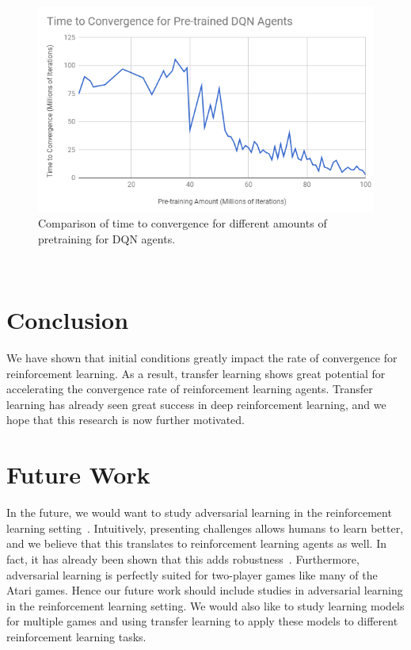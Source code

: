 \documentclass[twocolumn]{article}
\begin{document}
	\begin{figure}[htb]
		\centering
		\includegraphics[width=\linewidth]{convergence.PNG}
		\caption{Comparison of time to convergence for different amounts of 
		pretraining for DQN agents.}
		\label{fig:convergence}
	\end{figure}\\
	
	\section*{Conclusion}
	We have shown that initial conditions greatly impact the rate of 
	convergence for reinforcement learning. As a result, transfer learning 
	shows great potential for accelerating the convergence rate of 
	reinforcement learning agents. Transfer learning has already seen great 
	success in deep reinforcement learning, and we hope that this research is 
	now further motivated.\\
	
	\section*{Future Work}
	In the future, we would want to study adversarial learning in the 
	reinforcement learning setting~\cite{Lin}. Intuitively, presenting 
	challenges allows humans to learn better, and we believe that this 
	translates to reinforcement learning agents as well. In fact, it has 
	already been shown that this adds robustness~\cite{Pinto}. Furthermore, 
	adversarial learning is 
	perfectly suited for two-player games like many of the Atari games. Hence 
	our future work should include studies in adversarial learning in the 
	reinforcement learning setting. We would also like to study learning models 
	for multiple games and using transfer learning to apply these models to 
	different reinforcement learning tasks.\\

	
	{}
	
\end{document}
